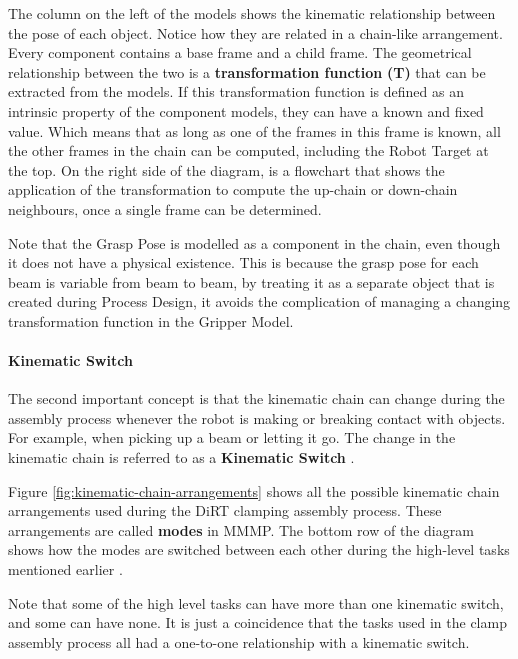 The column on the left of the models shows the kinematic relationship between the pose of each object. Notice how they are related in a chain-like arrangement. Every component contains a base frame and a child frame. The geometrical relationship between the two is a \textbf{transformation function} \textbf{(T) }that can be extracted from the models. If this transformation function is defined as an intrinsic property of the component models, they can have a known and fixed value. Which means that as long as one of the frames in this frame is known, all the other frames in the chain can be computed, including the Robot Target at the top. On the right side of the diagram, is a flowchart that shows the application of the transformation to compute the up-chain or down-chain neighbours, once a single frame can be determined.

Note that the Grasp Pose is modelled as a component in the chain, even though it does not have a physical existence. This is because the grasp pose for each beam is variable from beam to beam, by treating it as a separate object that is created during Process Design, it avoids the complication of managing a changing transformation function in the Gripper Model.

\paragraph{Kinematic Switch}

The second important concept is that the kinematic chain can change during the assembly process whenever the robot is making or breaking contact with objects. For example, when picking up a beam or letting it go. The change in the kinematic chain is referred to as a \textbf{Kinematic Switch} \parencite{garrettIntegratedTaskMotion2021}. 

Figure \ref{fig:kinematic-chain-arrangements} shows all the possible kinematic chain arrangements used during the DiRT clamping assembly process. These arrangements are called \textbf{modes }in MMMP. The bottom row of the diagram shows how the modes are switched between each other during the high-level tasks mentioned earlier . 

Note that some of the high level tasks can have more than one kinematic switch, and some can have none. It is just a coincidence that the tasks used in the clamp assembly process all had a one-to-one relationship with a kinematic switch. 


